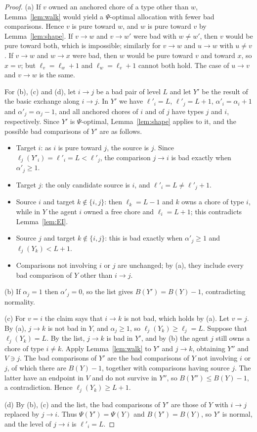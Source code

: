 \documentclass{amsart}
\numberwithin{equation}{section}
\theoremstyle{definition}
\theoremstyle{remark}
\begin{document}
\begin{proof}
(a) If $v$ owned an anchored chore of a type other than $w$, Lemma~\ref{lem:walk} would yield a $\Psi$-optimal allocation with fewer bad comparisons. Hence $v$ is pure toward $w$, and $w$ is pure toward $v$ by Lemma~\ref{lem:shape}. If $v\to w$ and $v\to w'$ were bad with $w\ne w'$, then $v$ would be pure toward both, which is impossible; similarly for $v\to w$ and $u\to w$ with $u\ne v$. If $v\to w$ and $w\to x$ were bad, then $w$ would be pure toward $v$ and toward $x$, so $x=v$; but $\ell_v=\ell_w+1$ and $\ell_w=\ell_v+1$ cannot both hold. The case of $u\to v$ and $v\to w$ is the same.

For (b), (c) and (d), let $i\to j$ be a bad pair of level $L$ and let $Y'$ be the result of the basic exchange along $i\to j$. In $Y'$ we have $\ell'_i=L$, $\ell'_j=L+1$, $\alpha'_i=\alpha_i+1$ and $\alpha'_j=\alpha_j-1$, and all anchored chores of $i$ and of $j$ have types $j$ and $i$, respectively. Since $Y'$ is $\Psi$-optimal, Lemma~\ref{lem:shape} applies to it, and the possible bad comparisons of $Y'$ are as follows.
\begin{itemize}
\item Target $i$: as $i$ is pure toward $j$, the source is $j$. Since $\ell_j(Y'_i)=\ell'_i=L<\ell'_j$, the comparison $j\to i$ is bad exactly when $\alpha'_j\ge1$.
\item Target $j$: the only candidate source is $i$, and $\ell'_i=L\ne\ell'_j+1$.
\item Source $i$ and target $k\notin\{i,j\}$: then $\ell_k=L-1$ and $k$ owns a chore of type $i$, while in $Y$ the agent $i$ owned a free chore and $\ell_i=L+1$; this contradicts Lemma~\ref{lem:EI}.
\item Source $j$ and target $k\notin\{i,j\}$: this is bad exactly when $\alpha'_j\ge1$ and $\ell_j(Y_k)<L+1$.
\item Comparisons not involving $i$ or $j$ are unchanged; by (a), they include every bad comparison of $Y$ other than $i\to j$.
\end{itemize}
(b) If $\alpha_j=1$ then $\alpha'_j=0$, so the list gives $B(Y')=B(Y)-1$, contradicting normality.

(c) For $v=i$ the claim says that $i\to k$ is not bad, which holds by (a). Let $v=j$. By (a), $j\to k$ is not bad in $Y$, and $\alpha_j\ge1$, so $\ell_j(Y_k)\ge\ell_j=L$. Suppose that $\ell_j(Y_k)=L$. By the list, $j\to k$ is bad in $Y'$, and by (b) the agent $j$ still owns a chore of type $i\ne k$. Apply Lemma~\ref{lem:walk} to $Y'$ and $j\to k$, obtaining $Y''$ and $V\ni j$. The bad comparisons of $Y'$ are the bad comparisons of $Y$ not involving $i$ or $j$, of which there are $B(Y)-1$, together with comparisons having source $j$. The latter have an endpoint in $V$ and do not survive in $Y''$, so $B(Y'')\le B(Y)-1$, a contradiction. Hence $\ell_j(Y_k)\ge L+1$.

(d) By (b), (c) and the list, the bad comparisons of $Y'$ are those of $Y$ with $i\to j$ replaced by $j\to i$. Thus $\Psi(Y')=\Psi(Y)$ and $B(Y')=B(Y)$, so $Y'$ is normal, and the level of $j\to i$ is $\ell'_i=L$.
\end{proof}
\end{document}
